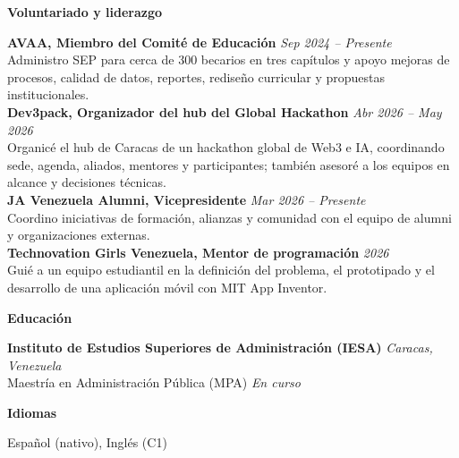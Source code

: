\documentclass[11pt]{article}
\begin{document}
\vspace{8pt}
\begin{center}
    \textbf{Voluntariado y liderazgo}
\end{center}
\vspace{-4pt}
\textbf{AVAA, Miembro del Comité de Educación} \hfill \textit{Sep 2024 -- Presente} \\
Administro SEP para cerca de 300 becarios en tres capítulos y apoyo mejoras de procesos, calidad de datos, reportes, rediseño curricular y propuestas institucionales. \\
\textbf{Dev3pack, Organizador del hub del Global Hackathon} \hfill \textit{Abr 2026 -- May 2026} \\
Organicé el hub de Caracas de un hackathon global de Web3 e IA, coordinando sede, agenda, aliados, mentores y participantes; también asesoré a los equipos en alcance y decisiones técnicas. \\
\textbf{JA Venezuela Alumni, Vicepresidente} \hfill \textit{Mar 2026 -- Presente} \\
Coordino iniciativas de formación, alianzas y comunidad con el equipo de alumni y organizaciones externas. \\
\textbf{Technovation Girls Venezuela, Mentor de programación} \hfill \textit{2026} \\
Guié a un equipo estudiantil en la definición del problema, el prototipado y el desarrollo de una aplicación móvil con MIT App Inventor.

\vspace{8pt}
\begin{center}
    \textbf{Educación}
\end{center}
\vspace{-4pt}
\textbf{Instituto de Estudios Superiores de Administración (IESA)} \hfill \textit{Caracas, Venezuela} \\
Maestría en Administración Pública (MPA) \hfill \textit{En curso} \\

\vspace{8pt}
\begin{center}
    \textbf{Idiomas}
\end{center}
\vspace{-4pt}
Español (nativo), Inglés (C1)
\end{document}
